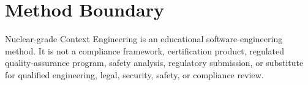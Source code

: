 \documentclass[11pt]{article}
\newcommand{\method}{Nuclear-grade Context Engineering}
\begin{document}
\section*{Method Boundary}

\method{} is an educational software-engineering method. It is not a compliance framework, certification product, regulated quality-assurance program, safety analysis, regulatory submission, or substitute for qualified engineering, legal, security, safety, or compliance review.

\begingroup
\fontsize{7.5pt}{8.4pt}\selectfont
\setlength{\bibsep}{0em}


\endgroup
\end{document}
